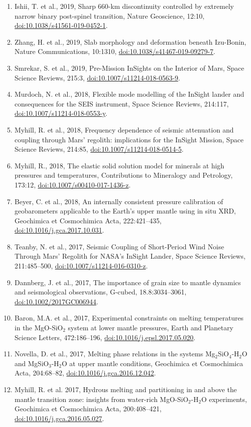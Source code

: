 \documentclass[11pt,twoside,a4paper]{article}
\newcommand{\doi}[1]{\href{http://dx.doi.org/#1}{doi:#1}}
\begin{document}
\begin{enumerate}
\item Ishii, T. et al., 2019, Sharp 660-km discontinuity controlled by extremely narrow binary post-spinel transition, Nature Geoscience, 12:10, \doi{10.1038/s41561-019-0452-1}.
\item Zhang, H. et al., 2019, Slab morphology and deformation beneath Izu-Bonin, Nature Communications, 10:1310, \doi{10.1038/s41467-019-09279-7}.
\item Smrekar, S. et al., 2019, Pre-Mission InSights on the Interior of Mars, Space Science Reviews, 215:3, \doi{10.1007/s11214-018-0563-9}.
\item Murdoch, N. et al., 2018, Flexible mode modelling of the InSight lander and consequences for the SEIS instrument, Space Science Reviews, 214:117, \doi{10.1007/s11214-018-0553-y}.
\item Myhill, R. et al., 2018, Frequency dependence of seismic attenuation and coupling through Mars' regolith: implications for the InSight Mission, Space Science Reviews, 214:85, \doi{10.1007/s11214-018-0514-5}.
\item Myhill, R., 2018, The elastic solid solution model for minerals at high pressures and temperatures, Contributions to Mineralogy and Petrology, 173:12, \doi{10.1007/s00410-017-1436-z}.
\item Beyer, C. et al., 2018, An internally consistent pressure calibration of geobarometers applicable to the Earth's upper mantle using in situ XRD, Geochimica et Cosmochimica Acta, 222:421--435, \doi{10.1016/j.gca.2017.10.031}.
\item Teanby, N. et al., 2017, Seismic Coupling of Short-Period Wind Noise Through Mars' Regolith for NASA's InSight Lander, Space Science Reviews, 211:485--500, \doi{10.1007/s11214-016-0310-z}.
\item Dannberg, J. et al., 2017, The importance of grain size to mantle dynamics and seismological observations, G-cubed, 18.8:3034--3061, \doi{10.1002/2017GC006944}.
\item Baron, M.A. et al., 2017, Experimental constraints on melting temperatures in the MgO-SiO$_2$ system at lower mantle pressures, Earth and Planetary Science Letters, 472:186--196, \doi{10.1016/j.epsl.2017.05.020}.
\item Novella, D. et al., 2017, Melting phase relations in the systems Mg$_2$SiO$_4$-H$_2$O and MgSiO$_3$-H$_2$O at upper mantle conditions, Geochimica et Cosmochimica Acta, 204:68--82, \doi{10.1016/j.gca.2016.12.042}.
\item Myhill, R. et al. 2017, Hydrous melting and partitioning in and above the mantle transition zone: insights from water-rich MgO-SiO$_2$-H$_2$O experiments, Geochimica et Cosmochimica Acta, 200:408--421, \doi{10.1016/j.gca.2016.05.027}.

\end{enumerate}
\end{document}
